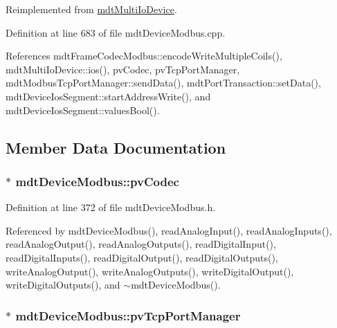 Reimplemented from \hyperlink{classmdt_multi_io_device_a03aedb552abcc344b1545d95f261e387}{mdt\-Multi\-Io\-Device}.



Definition at line 683 of file mdt\-Device\-Modbus.\-cpp.



References mdt\-Frame\-Codec\-Modbus\-::encode\-Write\-Multiple\-Coils(), mdt\-Multi\-Io\-Device\-::ios(), pv\-Codec, pv\-Tcp\-Port\-Manager, mdt\-Modbus\-Tcp\-Port\-Manager\-::send\-Data(), mdt\-Port\-Transaction\-::set\-Data(), mdt\-Device\-Ios\-Segment\-::start\-Address\-Write(), and mdt\-Device\-Ios\-Segment\-::values\-Bool().



\subsection{Member Data Documentation}
\hypertarget{classmdt_device_modbus_a2171d37ea720d546934f1c841e3c4d26}{
\subsubsection[{pv\-Codec}]{$\ast$ mdt\-Device\-Modbus\-::pv\-Codec\hspace{0.3cm}{\ttfamily [protected]}}}\label{classmdt_device_modbus_a2171d37ea720d546934f1c841e3c4d26}


Definition at line 372 of file mdt\-Device\-Modbus.\-h.



Referenced by mdt\-Device\-Modbus(), read\-Analog\-Input(), read\-Analog\-Inputs(), read\-Analog\-Output(), read\-Analog\-Outputs(), read\-Digital\-Input(), read\-Digital\-Inputs(), read\-Digital\-Output(), read\-Digital\-Outputs(), write\-Analog\-Output(), write\-Analog\-Outputs(), write\-Digital\-Output(), write\-Digital\-Outputs(), and $\sim$mdt\-Device\-Modbus().

\hypertarget{classmdt_device_modbus_a9ecbac63c29b229ab01f5fdb26008c95}{
\subsubsection[{pv\-Tcp\-Port\-Manager}]{$\ast$ mdt\-Device\-Modbus\-::pv\-Tcp\-Port\-Manager\hspace{0.3cm}{\ttfamily [protected]}}}\label{classmdt_device_modbus_a9ecbac63c29b229ab01f5fdb26008c95}


